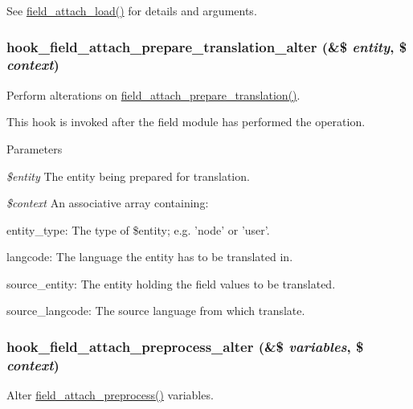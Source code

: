 See \hyperlink{group__field__attach_ga1e92543395961c912eb293b50e991586}{field\_\-attach\_\-load()} for details and arguments. \hypertarget{group__field__attach_ga497cd230a4a6bf6318784f6cf08e3758}{
\subsubsection[{hook\_\-field\_\-attach\_\-prepare\_\-translation\_\-alter}]{\setlength{\rightskip}{0pt plus 5cm}hook\_\-field\_\-attach\_\-prepare\_\-translation\_\-alter (\&\$ {\em entity}, \/  \$ {\em context})}}
\label{group__field__attach_ga497cd230a4a6bf6318784f6cf08e3758}
Perform alterations on \hyperlink{group__field__attach_ga7ce84fbf2feb3e4b22bacbe6ed5ed103}{field\_\-attach\_\-prepare\_\-translation()}.

This hook is invoked after the field module has performed the operation.


\begin{DoxyParams}{Parameters}
\item[{\em \$entity}]The entity being prepared for translation. \item[{\em \$context}]An associative array containing:
\begin{DoxyItemize}
\item entity\_\-type: The type of \$entity; e.g. 'node' or 'user'.
\item langcode: The language the entity has to be translated in.
\item source\_\-entity: The entity holding the field values to be translated.
\item source\_\-langcode: The source language from which translate. 
\end{DoxyItemize}\end{DoxyParams}
\hypertarget{group__field__attach_ga0d592a702a05792a8549ae777db00792}{
\subsubsection[{hook\_\-field\_\-attach\_\-preprocess\_\-alter}]{\setlength{\rightskip}{0pt plus 5cm}hook\_\-field\_\-attach\_\-preprocess\_\-alter (\&\$ {\em variables}, \/  \$ {\em context})}}
\label{group__field__attach_ga0d592a702a05792a8549ae777db00792}
Alter \hyperlink{group__field__attach_ga46c512cf3ddf3937a78f9c7a0da4dce6}{field\_\-attach\_\-preprocess()} variables.

